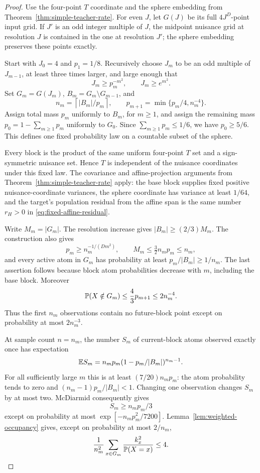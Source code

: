 \begin{proof}
Use the four-point $T$ coordinate and the sphere embedding from Theorem~\ref{thm:simple-teacher-rate}. For even $J$, let $G(J)$ be its full $4J^D$-point input grid. If $J'$ is an odd integer multiple of $J$, the midpoint nuisance grid at resolution $J$ is contained in the one at resolution $J'$; the sphere embedding preserves these points exactly.

Start with $J_0=4$ and $p_1=1/8$. Recursively choose $J_m$ to be an odd multiple of $J_{m-1}$, at least three times larger, and large enough that
\[
 J_m\ge p_m^{-m^2},\qquad J_m\ge e^{m^2}.
\]
Set $G_m=G(J_m)$, $B_m=G_m\setminus G_{m-1}$, and
\[
 n_m=\left\lceil |B_m|/p_m\right\rceil,
 \qquad
 p_{m+1}=\min\{p_m/4,n_m^{-4}\}.
\]
Assign total mass $p_m$ uniformly to $B_m$, for $m\ge1$, and assign the remaining mass $p_0=1-\sum_{m\ge1}p_m$ uniformly to $G_0$. Since $\sum_{m\ge1}p_m\le1/6$, we have $p_0\ge5/6$. This defines one fixed probability law on a countable subset of the sphere.

Every block is the product of the same uniform four-point $T$ set and a sign-symmetric nuisance set. Hence $T$ is independent of the nuisance coordinates under this fixed law. The covariance and affine-projection arguments from Theorem~\ref{thm:simple-teacher-rate} apply: the base block supplies fixed positive nuisance-coordinate variances, the sphere coordinate has variance at least $1/64$, and the target's population residual from the affine span is the same number $r_H>0$ in \eqref{eq:fixed-affine-residual}.

Write $M_m=|G_m|$. The resolution increase gives $|B_m|\ge(2/3)M_m$. The construction also gives
\begin{equation}
 p_m\ge n_m^{-1/(Dm^2)},\qquad
 M_m\le\tfrac32n_mp_m\le n_m,
 \label{eq:block-scales}
\end{equation}
and every active atom in $G_m$ has probability at least $p_m/|B_m|\ge1/n_m$. The last assertion follows because block atom probabilities decrease with $m$, including the base block. Moreover
\[
 \mathbb P(X\notin G_m)\le\frac43p_{m+1}\le2n_m^{-4}.
\]
Thus the first $n_m$ observations contain no future-block point except on probability at most $2n_m^{-3}$.

At sample count $n=n_m$, the number $S_m$ of current-block atoms observed exactly once has expectation
\[
 \mathbb E S_m=n_mp_m(1-p_m/|B_m|)^{n_m-1}.
\]
For all sufficiently large $m$ this is at least $(7/20)n_mp_m$: the atom probability tends to zero and $(n_m-1)p_m/|B_m|<1$. Changing one observation changes $S_m$ by at most two. McDiarmid consequently gives
\begin{equation}
 S_m\ge n_mp_m/3
 \label{eq:block-singletons}
\end{equation}
except on probability at most $\exp[-n_mp_m^2/7200]$.
Lemma~\ref{lem:weighted-occupancy} gives, except on probability at most $2/n_m$,
\begin{equation}
 \frac1{n_m^2}\sum_{x\in G_m}\frac{k_x^2}{\mathbb P(X=x)}\le4.
 \label{eq:block-witness-bound}
\end{equation}


\end{proof}
